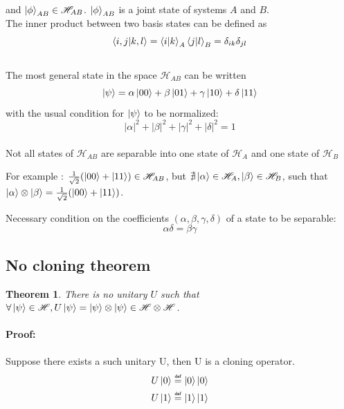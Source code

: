 \documentclass{article}
\newtheorem{theorem}{Theorem}
\newcommand\eqdef{\mathrel{\overset{\makebox[0pt]{\mbox{\normalfont\tiny\sffamily def}}}{=}}}
\begin{document}
and $\ket{\phi}_{AB} \in \mathscr{H}_{AB}$. $\ket{\phi}_{AB}$ is a joint state of systems $A$ and $B$.
\\\noindent
The inner product between two basis states can be defined as
\begin{equation}
    \braket{i,j|k,l}=\braket{i|k}_A\braket{j|l}_B = \delta_{ik}\delta_{jl}
\end{equation}
\\\noindent
The most general state in the space $\mathscr{H}_{AB}$ can be written
\begin{equation}
    \ket{\psi} = \alpha \ket{00} + \beta \ket{01} + \gamma \ket{10} + \delta \ket{11}
\end{equation}
with the usual condition for $\ket{\psi}$ to be normalized:
\begin{equation}
    |\alpha|^2+|\beta|^2+|\gamma|^2+|\delta|^2 = 1
\end{equation}
\\\noindent
Not all states of $\mathscr{H}_{AB}$ are separable into one state of $\mathscr{H}_{A}$
and one state of $\mathscr{H}_{B}$

For example : $\frac{1}{\sqrt{2}}(\ket{00} + \ket{11}) \in \mathscr{H}_{AB}$, but
$\nexists \ket{\alpha}\in \mathscr{H}_A, \ket{\beta}\in \mathscr{H}_B$, such that \\\noindent
$\ket{\alpha}\otimes\ket{\beta} = \frac{1}{\sqrt{2}}(\ket{00} + \ket{11})$.

Necessary condition on the coefficients $(\alpha, \beta, \gamma, \delta)$ of a state to be separable:
\begin{equation}
    \alpha\delta = \beta\gamma
\end{equation}

\subsection{No cloning theorem}
\begin{theorem}
    There is no unitary $U$ such that
    $\forall \ket{\psi} \in \mathscr{H}, U\ket{\psi}
    = \ket{\psi} \otimes \ket{\psi}
    \in \mathscr{H} \otimes \mathscr{H}$.
\end{theorem}
\paragraph{Proof: }
Suppose there exists a such unitary U, then U is a cloning operator.
\begin{equation}
    \begin{aligned}
        U\ket{0} \eqdef \ket{0}\ket{0} \\
        U\ket{1} \eqdef \ket{1}\ket{1}
    \end{aligned}
\end{equation}
\end{document}
